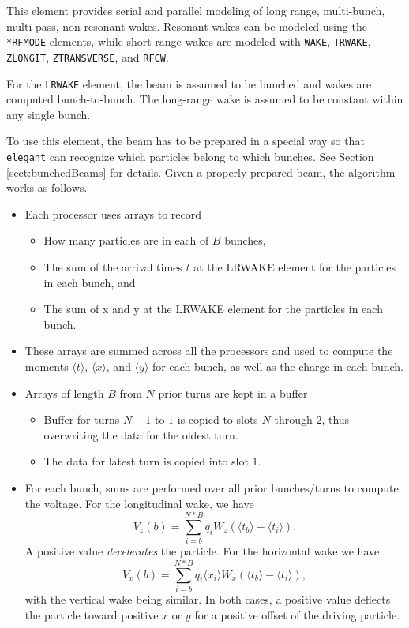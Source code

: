 This element provides serial and parallel modeling of long range, multi-bunch, multi-pass, non-resonant wakes.
Resonant wakes can be modeled using the \verb|*RFMODE| elements, while short-range wakes are modeled with
\verb|WAKE|, \verb|TRWAKE|, \verb|ZLONGIT|, \verb|ZTRANSVERSE|, and \verb|RFCW|.

For the \verb|LRWAKE| element, the beam is assumed to be bunched and wakes are computed bunch-to-bunch.
The long-range wake is assumed to be constant within any single bunch.

To use this element, the beam has to be prepared in a special way so that {\tt elegant} can recognize which
particles belong to which bunches.
See Section \ref{sect:bunchedBeams} for details.
Given a properly prepared beam, the algorithm works as follows.
\begin{itemize}
\item Each processor uses arrays to record
\begin{itemize}
  \item How many particles are in each of $B$ bunches,
  \item The sum of the arrival times $t$ at the LRWAKE element for the particles in each bunch, and
  \item The sum of x and y at the LRWAKE element for the particles in each bunch.
  \end{itemize}
\item These arrays are summed across all the processors and used to compute the moments
  $\langle t \rangle$, $\langle x \rangle$, and $\langle y \rangle$ for each bunch, as
  well as the charge in each bunch.
\item Arrays of length $B$ from $N$ prior turns are kept in a buffer
  \begin{itemize}
  \item Buffer for turns $N-1$ to $1$ is copied to slots $N$ through $2$, thus overwriting the data for
    the oldest turn.
  \item The data for latest turn is copied into slot 1.
  \end{itemize}
\item  For each bunch, sums are performed over all prior bunches/turns to compute the voltage. For the 
  longitudinal wake, we have
  \begin{equation}
    V_z(b) = \sum\limits_{i=b}^{N*B} q_i W_z(\langle t_b \rangle - \langle t_i \rangle).
  \end{equation}
A positive value {\em decelerates} the particle.
For the horizontal wake we have
  \begin{equation}
    V_x(b) = \sum\limits_{i=b}^{N*B} q_i \langle x_i \rangle W_x(\langle t_b \rangle - \langle t_i \rangle),
  \end{equation}
with the vertical wake being similar.
In both cases, a positive value deflects the particle toward positive $x$ or $y$ for a positive offset of the
driving particle.
\end{itemize}

